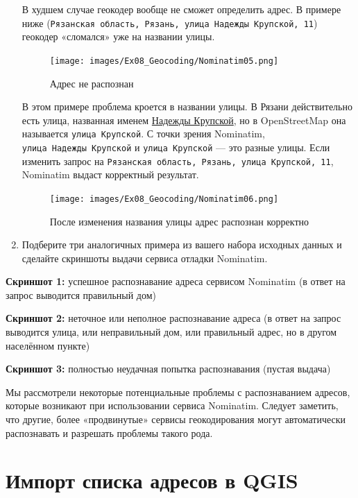 \documentclass[
  12pt,
]{book}
\begin{document}
\begin{enumerate}
  В худшем случае геокодер вообще не сможет определить адрес. В примере ниже (\texttt{Рязанская\ область,\ Рязань,\ улица\ Надежды\ Крупской,\ 11}) геокодер «сломался» уже на названии улицы.

  \begin{figure}
  \centering
  \texttt{[image: images/Ex08\_Geocoding/Nominatim05.png]}
  \caption{Адрес не распознан}
  \end{figure}

  В этом примере проблема кроется в названии улицы. В Рязани действительно есть улица, названная именем \href{https://ru.wikipedia.org/wiki/\%D0\%9A\%D1\%80\%D1\%83\%D0\%BF\%D1\%81\%D0\%BA\%D0\%B0\%D1\%8F,_\%D0\%9D\%D0\%B0\%D0\%B4\%D0\%B5\%D0\%B6\%D0\%B4\%D0\%B0_\%D0\%9A\%D0\%BE\%D0\%BD\%D1\%81\%D1\%82\%D0\%B0\%D0\%BD\%D1\%82\%D0\%B8\%D0\%BD\%D0\%BE\%D0\%B2\%D0\%BD\%D0\%B0}{Надежды Крупской}, но в OpenStreetMap она называется \texttt{улица\ Крупской}. С точки зрения Nominatim, \texttt{улица\ Надежды\ Крупской} и \texttt{улица\ Крупской} --- это разные улицы. Если изменить запрос на \texttt{Рязанская\ область,\ Рязань,\ улица\ Крупской,\ 11}, Nominatim выдаст корректный результат.

  \begin{figure}
  \centering
  \texttt{[image: images/Ex08\_Geocoding/Nominatim06.png]}
  \caption{После изменения названия улицы адрес распознан корректно}
  \end{figure}
\item
  Подберите три аналогичных примера из вашего набора исходных данных и сделайте скриншоты выдачи сервиса отладки Nominatim.
\end{enumerate}

\textbf{Скриншот 1:} успешное распознавание адреса сервисом Nominatim (в ответ на запрос выводится правильный дом)

\textbf{Скриншот 2:} неточное или неполное распознавание адреса (в ответ на запрос выводится улица, или неправильный дом, или правильный адрес, но в другом населённом пункте)

\textbf{Скриншот 3:} полностью неудачная попытка распознавания (пустая выдача)

Мы рассмотрели некоторые потенциальные проблемы с распознаванием адресов, которые возникают при использовании сервиса Nominatim. Следует заметить, что другие, более «продвинутые» сервисы геокодирования могут автоматически распознавать и разрешать проблемы такого рода.

\hypertarget{geocoding-import}{%
\section{Импорт списка адресов в QGIS}\label{geocoding-import}}
\end{document}
